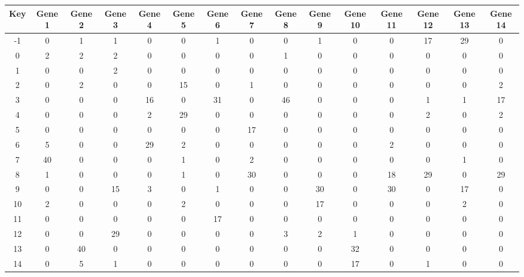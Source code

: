 \begin{tabular}{|c|c|c|c|c|c|c|c|c|c|c|c|c|c|c|}
\hline
Key & Gene 1 & Gene 2 & Gene 3 & Gene 4 & Gene 5 & Gene 6 & Gene 7 & Gene 8 & Gene 9 & Gene 10 & Gene 11 & Gene 12 & Gene 13 & Gene 14 \\
\hline
-1 & 0 & 1 & 1 & 0 & 0 & 1 & 0 & 0 & 1 & 0 & 0 & 17 & 29 & 0 \\
0 & 2 & 2 & 2 & 0 & 0 & 0 & 0 & 1 & 0 & 0 & 0 & 0 & 0 & 0 \\
1 & 0 & 0 & 2 & 0 & 0 & 0 & 0 & 0 & 0 & 0 & 0 & 0 & 0 & 0 \\
2 & 0 & 2 & 0 & 0 & 15 & 0 & 1 & 0 & 0 & 0 & 0 & 0 & 0 & 2 \\
3 & 0 & 0 & 0 & 16 & 0 & 31 & 0 & 46 & 0 & 0 & 0 & 1 & 1 & 17 \\
4 & 0 & 0 & 0 & 2 & 29 & 0 & 0 & 0 & 0 & 0 & 0 & 2 & 0 & 2 \\
5 & 0 & 0 & 0 & 0 & 0 & 0 & 17 & 0 & 0 & 0 & 0 & 0 & 0 & 0 \\
6 & 5 & 0 & 0 & 29 & 2 & 0 & 0 & 0 & 0 & 0 & 2 & 0 & 0 & 0 \\
7 & 40 & 0 & 0 & 0 & 1 & 0 & 2 & 0 & 0 & 0 & 0 & 0 & 1 & 0 \\
8 & 1 & 0 & 0 & 0 & 1 & 0 & 30 & 0 & 0 & 0 & 18 & 29 & 0 & 29 \\
9 & 0 & 0 & 15 & 3 & 0 & 1 & 0 & 0 & 30 & 0 & 30 & 0 & 17 & 0 \\
10 & 2 & 0 & 0 & 0 & 2 & 0 & 0 & 0 & 17 & 0 & 0 & 0 & 2 & 0 \\
11 & 0 & 0 & 0 & 0 & 0 & 17 & 0 & 0 & 0 & 0 & 0 & 0 & 0 & 0 \\
12 & 0 & 0 & 29 & 0 & 0 & 0 & 0 & 3 & 2 & 1 & 0 & 0 & 0 & 0 \\
13 & 0 & 40 & 0 & 0 & 0 & 0 & 0 & 0 & 0 & 32 & 0 & 0 & 0 & 0 \\
14 & 0 & 5 & 1 & 0 & 0 & 0 & 0 & 0 & 0 & 17 & 0 & 1 & 0 & 0 \\
\hline
\end{tabular}